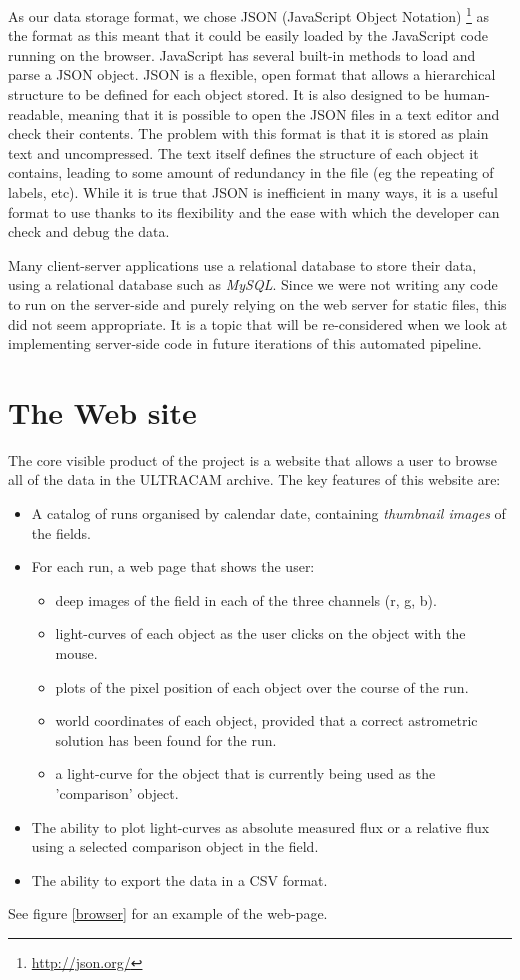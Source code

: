 As our data storage format, we chose JSON (JavaScript Object Notation) \footnote{\url{http://json.org/}} as the format as this meant that it could be easily loaded by the JavaScript code running on the browser. JavaScript has several built-in methods to load and parse a JSON object. JSON is a flexible, open format that allows a hierarchical structure to be defined for each object stored. It is also designed to be human-readable, meaning that it is possible to open the JSON files in a text editor and check their contents. The problem with this format is that it is stored as plain text and uncompressed. The text itself defines the structure of each object it contains, leading to some amount of redundancy in the file (eg the repeating of labels, etc). While it is true that JSON is inefficient in many ways, it is a useful format to use thanks to its flexibility and the ease with which the developer can check and debug the data. 

Many client-server applications use a relational database to store their data, using a relational database such as \emph{MySQL}. Since we were not writing any code to run on the server-side and purely relying on the web server for static files, this did not seem appropriate. It is a topic that will be re-considered when we look at implementing server-side code in future iterations of this automated pipeline. 

\section{The Web site}
The core visible product of the project is a website that allows a user to browse all of the data in the ULTRACAM archive. The key features of this website are:

\begin{itemize}
	\item A catalog of runs organised by calendar date, containing \emph{thumbnail images} of the fields.
	\item For each run, a web page that shows the user:
	\begin{itemize}
		\item deep images of the field in each of the three channels (r, g, b).
		\item light-curves of each object as the user clicks on the object with the mouse. 
		\item plots of the pixel position of each object over the course of the run.
		\item world coordinates of each object, provided that a correct astrometric solution has been found for the run. 
		\item a light-curve for the object that is currently being used as the 'comparison' object. 
	\end{itemize}
	\item The ability to plot light-curves as absolute measured flux or a relative flux using a selected comparison object in the field. 
	\item The ability to export the data in a CSV format.
	
\end{itemize}
See figure \ref{browser} for an example of the web-page. 


